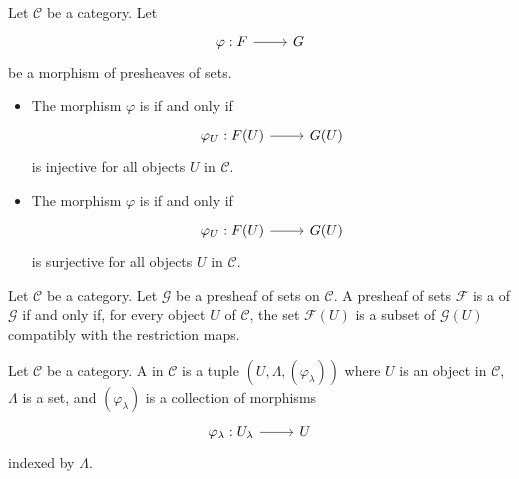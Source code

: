 \documentclass [11 pt, oneside] {article}
\begin{document}
\begin{definition}\label{}\text{}
Let $\mathscr{C}$ be a category. Let 
\[
\begin{tikzcd}
	\varphi : \mathscr{F}\ar[r]&\mathscr{G}
\end{tikzcd}
\]
be a morphism of presheaves of sets.
\begin{itemize}
	\item The morphism $\varphi$ is  if and only if 
		 \[
		\begin{tikzcd}
			\varphi_{U} :\mathscr{F}(U)\ar[r]&  \mathscr{G}(U)
		\end{tikzcd}
		\]
		is injective for all objects $U$ in $\mathscr{C}$.
	\item The morphism $\varphi$ is  if and only if
		\[
		\begin{tikzcd}
			\varphi_{U}:\mathscr{F}(U)\ar[r]&  \mathscr{G}(U)
		\end{tikzcd}
		\]
		is surjective for all objects $U$ in $\mathscr{C}$.	
\end{itemize}
\end{definition}

\begin{definition}\label{}\text{}
Let $\mathscr{C}$ be a category. Let $\mathscr{G}$ be a presheaf of sets on $\mathscr{C}$.
A presheaf of sets $\mathscr{F}$ is a  of $\mathscr{G}$ if and only if, for every object $U$ of $\mathscr{C}$, the set $\mathscr{F}(U)$ is a subset of $\mathscr{G}(U)$ compatibly with the restriction maps.
\end{definition}

\iffalse
\begin{definition}\label{}\text{}
Let $\mathscr{C}$ be a category.
A  in $\mathscr{C}$ is a tuple $(U,\Lambda,(\varphi_{\lambda}))$ where $U$ is an object in $\mathscr{C}$, $\Lambda$ is a set, and $(\varphi_{\lambda})$ is a collection of morphisms
\[
\begin{tikzcd}
	\varphi_{\lambda} : U_{\lambda} \ar[r]& U
\end{tikzcd}
\]
indexed by $\Lambda$.
\end{definition}
\end{document}
